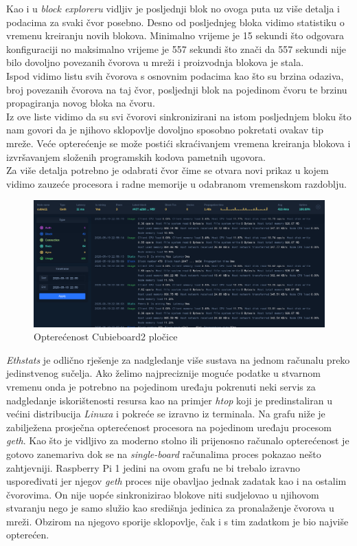 \documentclass[times, utf8, zavrsni, numeric]{fer}
\begin{document}
Kao i u \emph{block exploreru} vidljiv je posljednji blok no ovoga puta uz više detalja i podacima za svaki čvor posebno.
Desno od posljednjeg bloka vidimo statistiku o vremenu kreiranju novih blokova. Minimalno vrijeme je 15 sekundi što odgovara konfiguraciji
no maksimalno vrijeme je 557 sekundi što znači da 557 sekundi nije bilo dovoljno povezanih čvorova u mreži i proizvodnja blokova je stala. \\
Ispod vidimo listu svih čvorova s osnovnim podacima kao što su brzina odaziva, broj povezanih čvorova na taj čvor, posljednji blok na pojedinom
čvoru te brzinu propagiranja novog bloka na čvoru. \\
Iz ove liste vidimo da su svi čvorovi sinkronizirani na istom posljednjem bloku što nam govori da je njihovo sklopovlje dovoljno sposobno
pokretati ovakav tip mreže. Veće opterećenje se može postići skraćivanjem vremena kreiranja blokova i izvršavanjem složenih programskih
kodova pametnih ugovora. \\
Za više detalja potrebno je odabrati čvor čime se otvara novi prikaz u kojem vidimo zauzeće procesora i radne memorije u odabranom
vremenskom razdoblju.
\pagebreak

\begin{figure}[ht]
  \includegraphics[width=\textwidth]{ethstatsCubie.png}
  \caption{Opterećenost Cubieboard2 pločice}
  \centering
\end{figure}

\emph{Ethstats} je odlično rješenje za nadgledanje više sustava na jednom računalu preko jedinstvenog sučelja. Ako želimo najpreciznije 
moguće podatke u stvarnom vremenu onda je potrebno na pojedinom uređaju pokrenuti neki servis za nadgledanje iskorištenosti resursa kao
na primjer \emph{htop} koji je predinstaliran u većini distribucija \emph{Linuxa} i pokreće se izravno iz terminala. Na grafu niže
je zabilježena prosječna opterećenost procesora na pojedinom uređaju procesom \emph{geth}. Kao što je vidljivo za moderno stolno ili prijenosno računalo opterećenost
je gotovo zanemariva dok se na \emph{single-board} računalima proces pokazao nešto zahtjevniji. Raspberry Pi 1 jedini na ovom grafu ne bi trebalo izravno uspoređivati
jer njegov \emph{geth} proces nije obavljao jednak zadatak kao i na ostalim čvorovima. On nije uopće sinkronizirao blokove niti sudjelovao u njihovom stvaranju nego
je samo služio kao središnja jedinica za pronalaženje čvorova u mreži. Obzirom na njegovo sporije sklopovlje, čak i s tim zadatkom je bio najviše opterećen.
\end{document}
